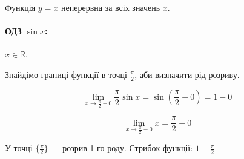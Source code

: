 \documentclass[../rgr1.tex]{subfiles}
\begin{document}
Функція $y=x$ неперервна за всіх значень $x$.

\paragraph{ОДЗ $\sin x$:} $x \in \mathbb R%
$.

Знайдімо границі
функції в точці $\frac{\pi}{2}$, аби визначити рід розриву.

\begin{equation}
	\lim_{x\to\frac{\pi}{2}+0}\frac{\pi}{2}\sin{x} =
	\sin\left(\frac{\pi}{2}+0\right) = 1-0
\end{equation}

\begin{equation}
	\lim_{x\to\frac{\pi}{2}-0}x =
	\frac{\pi}{2}-0
\end{equation}

У точці $\{\frac{\pi}{2}\}$ --- розрив 1-го роду. Стрибок функції: $1-\frac{\pi}{2}$

\end{document}
